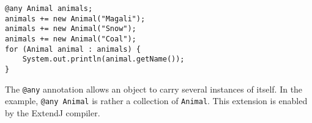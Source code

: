 \begin{listing}
    \centering
    \begin{verbatim}
@any Animal animals;
animals += new Animal("Magali");
animals += new Animal("Snow");
animals += new Animal("Coal");
for (Animal animal : animals) {
    System.out.println(animal.getName());
}
    \end{verbatim}
    \caption{
        The \texttt{@any} annotation allows an object to carry several instances of itself.
        In the example, \texttt{@any Animal} is rather a collection of \texttt{Animal}.
        This extension is enabled by the ExtendJ compiler.
    }
    \label{lst:jastadd-annotation-declaration}
\end{listing}